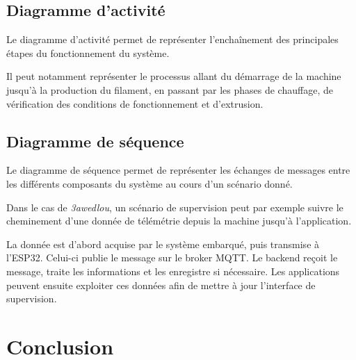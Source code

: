 \subsection{Diagramme d'activité}

Le diagramme d'activité permet de représenter l'enchaînement des
principales étapes du fonctionnement du système.

Il peut notamment représenter le processus allant du démarrage de la
machine jusqu'à la production du filament, en passant par les phases de
chauffage, de vérification des conditions de fonctionnement et
d'extrusion.

%

\subsection{Diagramme de séquence}

Le diagramme de séquence permet de représenter les échanges de messages
entre les différents composants du système au cours d'un scénario donné.

Dans le cas de \textit{3awedlou}, un scénario de supervision peut par
exemple suivre le cheminement d'une donnée de télémétrie depuis la machine
jusqu'à l'application.

La donnée est d'abord acquise par le système embarqué, puis transmise à
l'ESP32. Celui-ci publie le message sur le broker MQTT. Le backend reçoit
le message, traite les informations et les enregistre si nécessaire. Les
applications peuvent ensuite exploiter ces données afin de mettre à jour
l'interface de supervision.

%

\section{Conclusion}

